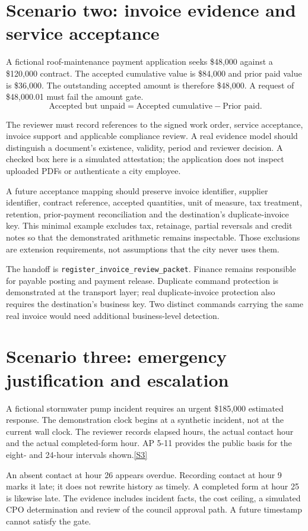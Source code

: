 \documentclass[11pt,letterpaper]{article}
\newcommand{\src}[1]{\hyperref[src:#1]{[#1]}}
\newcommand{\code}[1]{\texttt{\small #1}}
\begin{document}
\section{Scenario two: invoice evidence and service acceptance}
A fictional roof-maintenance payment application seeks \$48,000 against a \$120,000 contract. The accepted cumulative value is \$84,000 and prior paid value is \$36,000. The outstanding accepted amount is therefore \$48,000. A request of \$48,000.01 must fail the amount gate.
\[
\text{Accepted but unpaid}=\text{Accepted cumulative}-\text{Prior paid}.
\]

The reviewer must record references to the signed work order, service acceptance, invoice support and applicable compliance review. A real evidence model should distinguish a document's existence, validity, period and reviewer decision. A checked box here is a simulated attestation; the application does not inspect uploaded PDFs or authenticate a city employee.

A future acceptance mapping should preserve invoice identifier, supplier identifier, contract reference, accepted quantities, unit of measure, tax treatment, retention, prior-payment reconciliation and the destination's duplicate-invoice key. This minimal example excludes tax, retainage, partial reversals and credit notes so that the demonstrated arithmetic remains inspectable. Those exclusions are extension requirements, not assumptions that the city never uses them.

The handoff is \code{register\_invoice\_review\_packet}. Finance remains responsible for payable posting and payment release. Duplicate command protection is demonstrated at the transport layer; real duplicate-invoice protection also requires the destination's business key. Two distinct commands carrying the same real invoice would need additional business-level detection.

\section{Scenario three: emergency justification and escalation}
A fictional stormwater pump incident requires an urgent \$185,000 estimated response. The demonstration clock begins at a synthetic incident, not at the current wall clock. The reviewer records elapsed hours, the actual contact hour and the actual completed-form hour. AP 5-11 provides the public basis for the eight- and 24-hour intervals shown.\src{S3}

An absent contact at hour 26 appears overdue. Recording contact at hour 9 marks it late; it does not rewrite history as timely. A completed form at hour 25 is likewise late. The evidence includes incident facts, the cost ceiling, a simulated CPO determination and review of the council approval path. A future timestamp cannot satisfy the gate.
\end{document}
